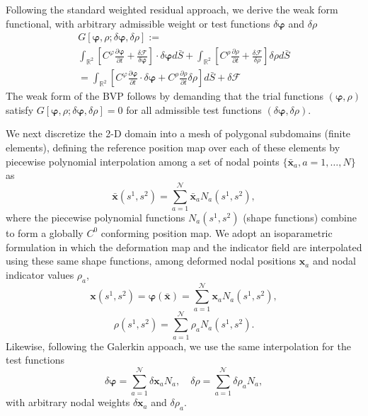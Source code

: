 \documentclass[
pre,
 twocolumn,
amsmath,
amssymb
]{revtex4}
\begin{document}
Following the standard weighted residual approach, we derive the weak form functional, with arbitrary admissible weight or test functions $\delta\bm{\varphi}$ and $\delta\rho$
\begin{multline}
G[\bm{\varphi},\rho;\delta\bm{\varphi},\delta\rho] := \\ 
\int_{\mathbb{R}^2} 
\left[
C^\varphi\frac{\partial\bm{\varphi}}{\partial t} + \frac{\delta \mathcal{F}}{\delta\bm{\varphi}} 
\right]\cdot\delta\bm{\varphi} 
d\bar{S} 
+ \int_{\mathbb{R}^2} 
\left[
C^\rho\frac{\partial\rho}{\partial t} + \frac{\delta \mathcal{F}}{\delta\rho}
\right] \delta\rho
d\bar{S} \\
 = \int_{\mathbb{R}^2} 
\left[
C^\varphi\frac{\partial\bm{\varphi}}{\partial t}\cdot\delta\bm{\varphi}  +
C^\rho\frac{\partial\rho}{\partial t} \delta\rho 
\right]
d\bar{S} + \delta\mathcal{F}
\end{multline}
The weak form of the BVP follows by demanding that the trial functions $(\bm{\varphi},\rho)$ satisfy $G[\bm{\varphi},\rho;\delta\bm{\varphi},\delta\rho]=0$ for all admissible test functions  $(\delta\bm{\varphi},\delta\rho)$.

We next discretize the 2-D domain into a mesh of polygonal subdomains
(finite elements), defining the reference position map over each of these elements
by piecewise polynomial interpolation among a set of nodal points $\{\bar{\bm{x}}_a, a=1,\dots,N\}$ as
\begin{equation}\label{eq:referenceInterpolation}
  \bar{\bm{x}}(s^1,s^2) = \sum_{a=1}^\mathcal{N}{\bar{\bm{x}}_{a} N_{a}(s^{1},s^{2}) } ,
\end{equation}
where the piecewise polynomial functions
$N_a(s^1,s^2)$ (shape functions) combine to form a globally $C^0$
conforming position map.  
%
We adopt an isoparametric formulation in which the deformation map and the indicator field are interpolated using these same shape functions, among deformed nodal positions $\bm{x}_a$ and nodal indicator values $\rho_a$,
\begin{equation}\label{eq:deformedInterpolation}
  \bm{x}(s^1,s^2) = \bm{\varphi}(\bar{\bm{x}}) = \sum_{a=1}^\mathcal{N}{\bm{x}_{a} N_{a}(s^{1},s^{2}) } , 
\end{equation}
%
\begin{equation}\label{eq:indicatorInterpolation}
  \rho(s^1,s^2) = \sum_{a=1}^\mathcal{N}{\rho_a N_{a}(s^{1},s^{2}) } .
\end{equation}
Likewise, following the Galerkin appoach, we use the same interpolation for the test functions
\begin{equation}
  \delta\bm{\varphi} = \sum_{a=1}^\mathcal{N}{\delta\bm{x}_{a} N_{a} } , \quad
  \delta\rho = \sum_{a=1}^\mathcal{N}{\delta\rho_a N_{a} } ,
\end{equation}
%
with arbitrary nodal weights  $\delta\bm{x}_a$ and $\delta\rho_a$.
\end{document}
